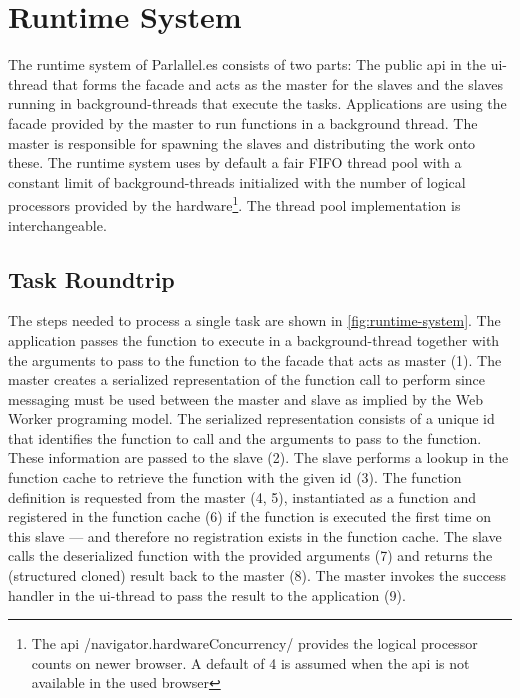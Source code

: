 \section{Runtime System}\label{sec:runtime-system}
The runtime system of Parlallel.es consists of two parts: The public api in the ui-thread that forms the facade and acts as the master for the slaves and the slaves running in background-threads that execute the tasks. Applications are using the facade provided by the master to run functions in a background thread. The master is responsible for spawning the slaves and distributing the work onto these. The runtime system uses by default a fair FIFO thread pool with a constant limit of background-threads initialized with the number of logical processors provided by the hardware\footnote{The api \javascriptinline/navigator.hardwareConcurrency/ provides the logical processor counts on newer browser. A default of 4 is assumed when the api is not available in the used browser}. The thread pool implementation is interchangeable. 

\subsection{Task Roundtrip}
The steps needed to process a single task are shown in \cref{fig:runtime-system}. The application passes the function to execute in a background-thread together with the arguments to pass to the function to the facade that acts as master (1). The master creates a serialized representation of the function call to perform since messaging must be used between the master and slave as implied by the Web Worker programing model. The serialized representation consists of a unique id that identifies the function to call and the arguments to pass to the function. These information are passed to the slave (2). The slave performs a lookup in the function cache to retrieve the function with the given id (3). The function definition is requested from the master (4, 5), instantiated as a function and registered in the function cache (6) if the function is executed the first time on this slave --- and therefore no registration exists in the function cache. The slave calls the deserialized function with the provided arguments (7) and returns the (structured cloned) result back to the master (8). The master invokes the success handler in the ui-thread to pass the result to the application (9). 

